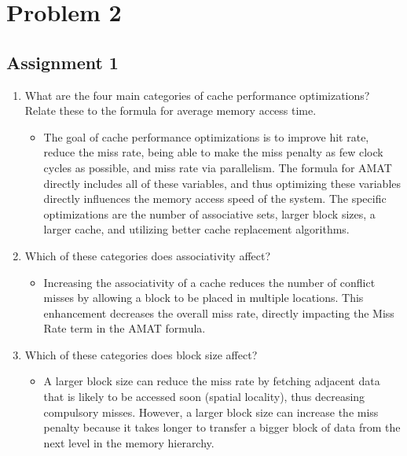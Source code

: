 \documentclass{article}
\begin{document}
\section{Problem 2}
\subsection{Assignment 1}
\begin{enumerate}
	\item What are the four main categories of cache performance optimizations? Relate these to the
	formula for average memory access time.
	\begin{itemize}
		\item The goal of cache performance optimizations is to improve hit rate, reduce the miss rate, being able to make the miss penalty as few clock cycles as possible, and miss rate via parallelism. The formula for AMAT directly includes all of these variables, and thus optimizing these variables directly influences the memory access speed of the system. The specific optimizations are the number of associative sets, larger block sizes, a larger cache, and utilizing better cache replacement algorithms.  
	\end{itemize}
	\item Which of these categories does associativity affect?
	\begin{itemize}
		\item Increasing the associativity of a cache reduces the number of conflict misses by allowing a block to be placed in multiple locations. This enhancement decreases the overall miss rate, directly impacting the Miss Rate term in the AMAT formula.
	\end{itemize}
	\item Which of these categories does block size affect?
	\begin{itemize}
		\item A larger block size can reduce the miss rate by fetching adjacent data that is likely to be accessed soon (spatial locality), thus decreasing compulsory misses. However, a larger block size can increase the miss penalty because it takes longer to transfer a bigger block of data from the next level in the memory hierarchy.
	\end{itemize}
\end{enumerate}
\end{document}
